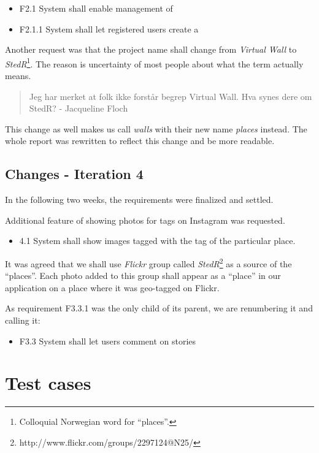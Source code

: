 \documentclass[11pt]{book}
\begin{document}
\begin{itemize}
  \item F2.1 System shall enable management of \wallentityp
  \item F2.1.1 System shall let registered users create a \wallentitys
\end{itemize}

Another request was that the project name shall change from \emph{Virtual Wall} to \emph{StedR}\footnote{Colloquial Norwegian word for ``places''.}. The reason is uncertainty of most people about what the term actually means.

\begin{quote}
Jeg har merket at folk ikke forstår begrep Virtual Wall. Hva synes dere om StedR? - Jacqueline Floch
\end{quote}

This change as well makes us call \emph{walls} with their new name \emph{places} instead. The whole report was rewritten to reflect this change and be more readable.

\section{Changes - Iteration 4}\label{changes---iteration-4}

In the following two weeks, the requirements were finalized and settled.

Additional feature of showing photos for tags on Instagram was requested.

\begin{itemize}
  \item 4.1 System shall show images tagged with the tag of the particular
  place.
\end{itemize}

It was agreed that we shall use \emph{Flickr} group called \emph{StedR}\footnote{http://www.flickr.com/groups/2297124@N25/} as a source of the ``places''. Each photo added to this group shall appear as a ``place'' in our application on a place where it was geo-tagged on Flickr.

As requirement F3.3.1 was the only child of its parent, we are renumbering it and calling it:

\begin{itemize}
  \item F3.3 System shall let users comment on stories
\end{itemize}

\chapter{Test cases}\label{appendix:testcases}
\end{document}

